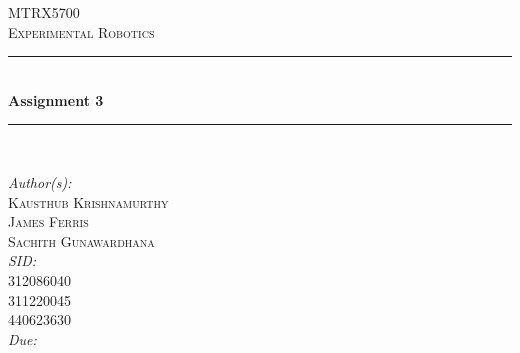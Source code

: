 \begin{titlepage}
	\newcommand{\HRule}{\rule{\linewidth}{0.5mm}}
	\center
	\textsc{\LARGE MTRX5700 \\[0.5cm]Experimental Robotics}\\[1cm] 
	\HRule \\[0.4cm]
	{ \huge \bfseries Assignment 3}\\[0.4cm] 
	\HRule \\[1.5cm]
	\begin{minipage}{1\textwidth}
		\large
		\flushleft
		\emph{Author(s):}\hspace{0.2cm}\textsc{\\Kausthub Krishnamurthy\\James Ferris\\Sachith Gunawardhana}\\ [0.25cm]
		\emph{SID:}\hspace{0.7cm}	\\312086040\\311220045\\440623630\\[0.5cm]
		\emph{Due:}
		\hspace{0.55cm}{May 6, 2015}\hspace{1cm}\\[3cm]	%
	\end{minipage}
	\vfill
\end{titlepage}